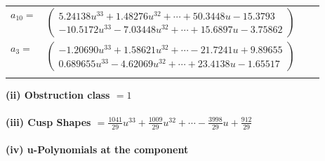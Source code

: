 \documentclass[1p]{elsarticle_modified}
\theoremstyle{definition}
\begin{document}
\begin{tabular}{m{7pt} m{180pt} m{7pt} m{180pt} }
\flushright $a_{10}=$&$\begin{pmatrix}5.24138 u^{33}+1.48276 u^{32}+\cdots+50.3448 u-15.3793\\-10.5172 u^{33}-7.03448 u^{32}+\cdots+15.6897 u-3.75862\end{pmatrix}$ \\
\flushright $a_{3}=$&$\begin{pmatrix}-1.20690 u^{33}+1.58621 u^{32}+\cdots-21.7241 u+9.89655\\0.689655 u^{33}-4.62069 u^{32}+\cdots+23.4138 u-1.65517\end{pmatrix}$\\&\end{tabular}
\flushleft \textbf{(ii) Obstruction class $= 1$}\\~\\
\flushleft \textbf{(iii) Cusp Shapes $= \frac{1041}{29} u^{33}+\frac{1009}{29} u^{32}+\cdots-\frac{3998}{29} u+\frac{912}{29}$}\\~\\
\newpage\renewcommand{\arraystretch}{1}
\flushleft \textbf{(iv) u-Polynomials at the component}\newline \\
\end{document}

